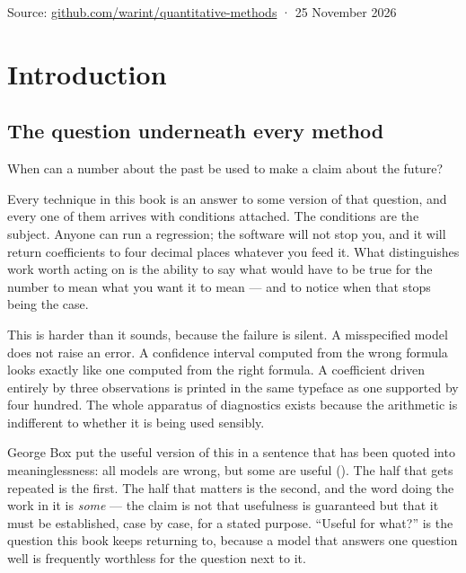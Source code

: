 \documentclass[
  letterpaper,
  10pt,
  twoside,
  openright,
  numbers=noenddot,
  chapterprefix=true]{scrbook}
\newenvironment{qmibmuted}{\begingroup\small\color{econmuted}}{\par\endgroup}
\begin{document}
\begin{qmibmuted}

Source:
\href{https://github.com/warint/quantitative-methods}{github.com/warint/quantitative-methods}
· 25 November 2026

\end{qmibmuted}


\chapter{Introduction}\label{introduction}

\section{The question underneath every
method}\label{the-question-underneath-every-method}

When can a number about the past be used to make a claim about the
future?

Every technique in this book is an answer to some version of that
question, and every one of them arrives with conditions attached. The
conditions are the subject. Anyone can run a regression; the software
will not stop you, and it will return coefficients to four decimal
places whatever you feed it. What distinguishes work worth acting on is
the ability to say what would have to be true for the number to mean
what you want it to mean --- and to notice when that stops being the
case.

This is harder than it sounds, because the failure is silent. A
misspecified model does not raise an error. A confidence interval
computed from the wrong formula looks exactly like one computed from the
right formula. A coefficient driven entirely by three observations is
printed in the same typeface as one supported by four hundred. The whole
apparatus of diagnostics exists because the arithmetic is indifferent to
whether it is being used sensibly.

George Box put the useful version of this in a sentence that has been
quoted into meaninglessness: all models are wrong, but some are useful
(). The half that gets
repeated is the first. The half that matters is the second, and the word
doing the work in it is \emph{some} --- the claim is not that usefulness
is guaranteed but that it must be established, case by case, for a
stated purpose. ``Useful for what?'' is the question this book keeps
returning to, because a model that answers one question well is
frequently worthless for the question next to it.
\end{document}

